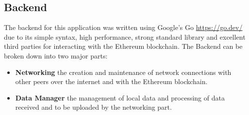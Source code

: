 \subsection{Backend}\label{subsec:backend}

The backend for this application was written using Google's Go \url{https://go.dev/} due to its simple syntax, high performance, strong standard library and excellent third parties for interacting with the Ethereum blockchain. The Backend can be broken down into two major parts:

\begin{itemize}
  \item \textbf{Networking} the creation and maintenance of network connections with other peers over the internet and with the Ethereum blockchain.
  \item \textbf{Data Manager} the management of local data and processing of data received and to be uploaded by the networking part.
\end{itemize}



